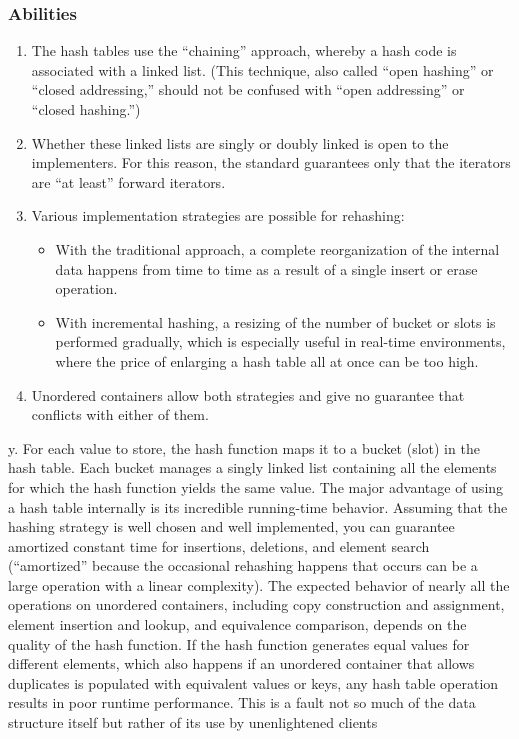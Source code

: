 \documentclass{report}
\begin{document}
\subsubsection{Abilities}
\bigbreak \noindent 
\begin{enumerate}
    \item The hash tables use the “chaining” approach, whereby a hash code is associated with a linked list. (This technique, also called “open hashing” or “closed addressing,” should not be confused with “open addressing” or “closed hashing.”)
    \item Whether these linked lists are singly or doubly linked is open to the implementers. For this reason, the standard guarantees only that the iterators are “at least” forward iterators.
    \item Various implementation strategies are possible for rehashing:
        \begin{itemize}
            \item With the traditional approach, a complete reorganization of the internal data happens from time to time as a result of a single insert or erase operation.
            \item With incremental hashing, a resizing of the number of bucket or slots is performed gradually, which is especially useful in real-time environments, where the price of enlarging a hash table all at once can be too high.
        \end{itemize}
    \item Unordered containers allow both strategies and give no guarantee that conflicts with either of them.

\end{enumerate}
\bigbreak \noindent 
y. For each value to store, the hash function maps it to a
bucket (slot) in the hash table. Each bucket manages a singly linked list containing all the elements
for which the hash function yields the same value.
\bigbreak \noindent 
The major advantage of using a hash table internally is its incredible running-time behavior.
Assuming that the hashing strategy is well chosen and well implemented, you can guarantee amortized constant time for insertions, deletions, and element search (“amortized” because the occasional
rehashing happens that occurs can be a large operation with a linear complexity).
\bigbreak \noindent 
The expected behavior of nearly all the operations on unordered containers, including copy construction and assignment, element insertion and lookup, and equivalence comparison, depends on
the quality of the hash function. If the hash function generates equal values for different elements, which also happens if an unordered container that allows duplicates is populated with equivalent
values or keys, any hash table operation results in poor runtime performance. This is a fault not so
much of the data structure itself but rather of its use by unenlightened clients
\end{document}
